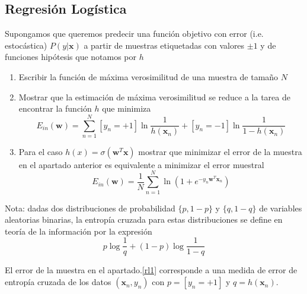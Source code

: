 \documentclass[11pt,leqno]{article}
\theoremstyle{definition}
\begin{document}
\subsection{Regresión Logística}
\begin{cuestion}
	Supongamos que queremos predecir una función objetivo con error (i.e. estocástica) $P(y|\mathbf{x})$ a partir de muestras etiquetadas con valores $\pm 1$ y de funciones hipótesis que notamos por $h$ 

\begin{enumerate}[a]
	\item Escribir la función de máxima verosimilitud de una muestra de tamaño $N$
	\item \label{rl1} Mostrar que la estimación de máxima verosimilitud se reduce a la tarea de encontrar la función $h$ que minimiza
	\[
	E_{in}(\mathbf{w}) = 
	\sum_{n=1}^N 
		[ y_n = +1 ] \ln{\frac{1}{h(\mathbf{x}_n)}} +
		[ y_n = -1 ] \ln{\frac{1}{1-h(\mathbf{x}_n)}}
	\]
	
	\item Para el caso $h(x) = \sigma(\mathbf{w}^T\mathbf{x})$ mostrar que minimizar el error de la muestra en el apartado anterior es equivalente a minimizar el error muestral 
	\[
	E_{in}(\mathbf{w}) = 
		\frac{1}{N} \sum_{n=1}^{N} 
			\ln{ \left( 1 + e^{-y_n\mathbf{w}^T\mathbf{x}_n} \right) }
	\]
\end{enumerate}

Nota: dadas dos distribuciones de probabilidad $\{p, 1-p\}$ y $\{q, 1-q\}$ de variables aleatorias binarias, la entropía cruzada para estas distribuciones se define en teoría de la información por la expresión
	\[ p\log{\frac{1}{q}} + (1-p)\log{\frac{1}{1-q}}\]
	
El error de la muestra en el apartado.\ref{rl1} corresponde a una medida de error de entropía cruzada de los datos $(\mathbf{x}_n,y_n)$ con $p=[y_n=+1 ]$ y $q = h(\mathbf{x}_n)$.
\end{cuestion}

\begin{solucion}
\end{solucion}
\end{document}
